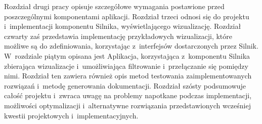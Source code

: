 Rozdział drugi pracy opisuje szczegółowe wymagania postawione przed poszczególnymi komponentami aplikacji. Rozdział trzeci odnosi się do projektu i~implementacji komponentu Silnika, wyświetlającego wizualizację. Rozdział czwarty zaś przedstawia implementację przykładowych wizualizacji, które możliwe są do zdefiniowania, korzystając z~interfejsów dostarczonych przez Silnik. W~rozdziale piątym opisana jest Aplikacja, korzystająca z~komponentu Silnika zbierająca wizualizacje i~umożliwiająca filtrowanie i~przełączanie się pomiędzy nimi. Rozdział ten zawiera również opis metod testowania zaimplementowanych rozwiązań i~metodę generowania dokumentacji. Rozdział szósty podsumowuje całość projektu i~zwraca uwagę na problemy napotkane podczas implementacji, możliwości optymalizacji i~alternatywne rozwiązania przedstawionych wcześniej kwestii projektowych i~implementacyjnych.